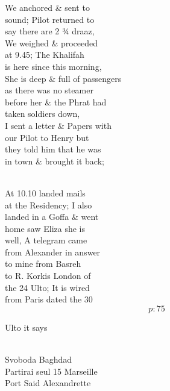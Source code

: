\documentclass{report}
\begin{document}
	\par{
 	We anchored \& sent to\ \\sound; Pilot returned to\ \\say there are 2 ¾ draaz,\ \\We weighed \& proceeded\ \\at 9.45; The Khalifah\ \\is here since this morning,\ \\She is deep \& full of passengers\ \\as there was no steamer\ \\before her \& the Phrat had\ \\taken soldiers down,\ \\I sent a letter \& Papers with\ \\our Pilot to Henry but\ \\they told him that he was\ \\in town \& brought it back;\ \\\ \\
	}

	\par{
 	At 10.10 landed mails\ \\at the Residency; I also\ \\landed in a Goffa \& went\ \\home saw Eliza she is\ \\well, A telegram came\ \\from Alexander in answer\ \\to mine from Basreh\ \\to R. Korkis London of\ \\the 24 Ulto; It is wired\ \\from Paris dated the 30\ \\
  \[p: 75 \]

	}




	\par{
 	Ulto it says\ \\\ \\
	}

	\par{
 	Svoboda Baghdad\ \\Partirai seul 15 Marseille\ \\Port Said Alexandrette\ \\\ \\
	}
\end{document}
